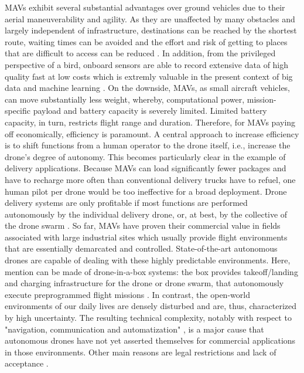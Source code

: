 MAVs exhibit several substantial advantages over ground vehicles due to their aerial maneuverability and agility.
As they are unaffected by many obstacles and largely independent of infrastructure,
destinations can be reached by the shortest route, waiting times can be avoided
and the effort and risk of getting to places that are difficult to access can be reduced \cite{Watts2012}.
In addition, from the privileged perspective of a bird, onboard sensors 
are able to record extensive data of high quality fast at low costs
which is extremly valuable in the present context of big data and machine learning \cite{PwC2016, Garcia2019}.
On the downside,
MAVs, as small aircraft vehicles, can move substantially less weight, 
whereby, computational power, mission-specific payload and battery capacity is severely limited.
Limited battery capacity, in turn, restricts flight range and duration.
Therefore, for MAVs paying off economically, efficiency is paramount.
A central approach to increase efficiency is to shift functions from a human operator to the drone itself,
i.e., increase the drone's degree of autonomy.
This becomes particularly clear in the example of delivery applications.
Because MAVs can load significantly fewer packages and
have to recharge more often than conventional delivery trucks have to refuel,
one human pilot per drone would be too ineffective for a broad deployment.
Drone delivery systems are only profitable
if most functions are performed autonomously by the individual delivery drone,
or, at best, by the collective of the drone swarm \cite{Chiang2019, Lee2017}.
So far, MAVs have proven their commercial value in fields associated with large industrial sites
which usually provide flight environments that are essentially demarcated and controlled.
State-of-the-art autonomous drones are capable of dealing with these highly predictable environments.
Here, mention can be made of drone-in-a-box systems:
the box provides takeoff/landing and charging infrastructure for
the drone or drone swarm, that autonomously execute preprogrammed flight missions \cite{drones5040108}.
In contrast, the open-world environments of our daily lives 
are densely disturbed and are, thus, characterized by high uncertainty.
The resulting technical complexity, 
notably with respect to "navigation, communication and automatization" \cite{kellermann2020drones},
is a major cause that
autonomous drones have not yet asserted themselves for commercial applications in those environments.
Other main reasons are legal restrictions and lack of acceptance \cite{Rosen2019}.



